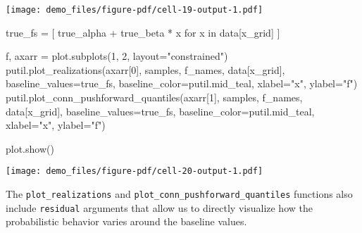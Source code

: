 \documentclass[
  letterpaper,
  DIV=11,
  numbers=noendperiod]{scrartcl}
\newenvironment{Shaded}{\begin{snugshade}}{\end{snugshade}}
\newcommand{\ControlFlowTok}[1]{\textcolor[rgb]{0.00,0.23,0.31}{#1}}
\newcommand{\DecValTok}[1]{\textcolor[rgb]{0.68,0.00,0.00}{#1}}
\newcommand{\KeywordTok}[1]{\textcolor[rgb]{0.00,0.23,0.31}{#1}}
\newcommand{\NormalTok}[1]{\textcolor[rgb]{0.00,0.23,0.31}{#1}}
\newcommand{\OperatorTok}[1]{\textcolor[rgb]{0.37,0.37,0.37}{#1}}
\newcommand{\StringTok}[1]{\textcolor[rgb]{0.13,0.47,0.30}{#1}}
\begin{document}
\texttt{[image: demo\_files/figure-pdf/cell-19-output-1.pdf]}

\begin{Shaded}
\begin{Highlighting}[]
\NormalTok{true\_fs }\OperatorTok{=}\NormalTok{ [ true\_alpha }\OperatorTok{+}\NormalTok{ true\_beta }\OperatorTok{*}\NormalTok{ x }\ControlFlowTok{for}\NormalTok{ x }\KeywordTok{in}\NormalTok{ data[}\StringTok{\textquotesingle{}x\_grid\textquotesingle{}}\NormalTok{] ]}

\NormalTok{f, axarr }\OperatorTok{=}\NormalTok{ plot.subplots(}\DecValTok{1}\NormalTok{, }\DecValTok{2}\NormalTok{, layout}\OperatorTok{=}\StringTok{"constrained"}\NormalTok{)}
\NormalTok{putil.plot\_realizations(axarr[}\DecValTok{0}\NormalTok{], samples,}
\NormalTok{                        f\_names, data[}\StringTok{\textquotesingle{}x\_grid\textquotesingle{}}\NormalTok{],}
\NormalTok{                        baseline\_values}\OperatorTok{=}\NormalTok{true\_fs,}
\NormalTok{                        baseline\_color}\OperatorTok{=}\NormalTok{putil.mid\_teal,}
\NormalTok{                        xlabel}\OperatorTok{=}\StringTok{"x"}\NormalTok{, ylabel}\OperatorTok{=}\StringTok{"f"}\NormalTok{)}
\NormalTok{putil.plot\_conn\_pushforward\_quantiles(axarr[}\DecValTok{1}\NormalTok{], samples,}
\NormalTok{                                      f\_names, data[}\StringTok{\textquotesingle{}x\_grid\textquotesingle{}}\NormalTok{],}
\NormalTok{                                      baseline\_values}\OperatorTok{=}\NormalTok{true\_fs,}
\NormalTok{                                      baseline\_color}\OperatorTok{=}\NormalTok{putil.mid\_teal,}
\NormalTok{                                      xlabel}\OperatorTok{=}\StringTok{"x"}\NormalTok{, ylabel}\OperatorTok{=}\StringTok{"f"}\NormalTok{)}

\NormalTok{plot.show()}
\end{Highlighting}
\end{Shaded}

\texttt{[image: demo\_files/figure-pdf/cell-20-output-1.pdf]}

The \texttt{plot\_realizations} and
\texttt{plot\_conn\_pushforward\_quantiles} functions also include
\texttt{residual} arguments that allow us to directly visualize how the
probabilistic behavior varies around the baseline values.
\end{document}
